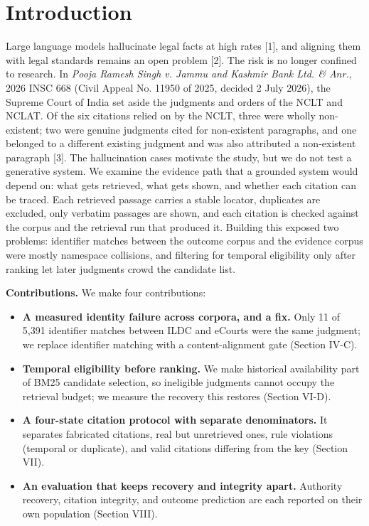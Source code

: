 \documentclass[conference]{IEEEtran}
\begin{document}
\section{Introduction}
Large language models hallucinate legal facts at high rates [1], and aligning them with legal standards remains an open problem [2]. The risk is no longer confined to research. In \textit{Pooja Ramesh Singh v. Jammu and Kashmir Bank Ltd. \& Anr.}, 2026 INSC 668 (Civil Appeal No. 11950 of 2025, decided 2 July 2026), the Supreme Court of India set aside the judgments and orders of the NCLT and NCLAT. Of the six citations relied on by the NCLT, three were wholly non-existent; two were genuine judgments cited for non-existent paragraphs, and one belonged to a different existing judgment and was also attributed a non-existent paragraph [3]. The hallucination cases motivate the study, but we do not test a generative system. We examine the evidence path that a grounded system would depend on: what gets retrieved, what gets shown, and whether each citation can be traced. Each retrieved passage carries a stable locator, duplicates are excluded, only verbatim passages are shown, and each citation is checked against the corpus and the retrieval run that produced it. Building this exposed two problems: identifier matches between the outcome corpus and the evidence corpus were mostly namespace collisions, and filtering for temporal eligibility only after ranking let later judgments crowd the candidate list.

\textbf{Contributions.} We make four contributions:
\begin{itemize}
\item \textbf{A measured identity failure across corpora, and a fix.} Only 11 of 5,391 identifier matches between ILDC and eCourts were the same judgment; we replace identifier matching with a content-alignment gate (Section IV-C).
\item \textbf{Temporal eligibility before ranking.} We make historical availability part of BM25 candidate selection, so ineligible judgments cannot occupy the retrieval budget; we measure the recovery this restores (Section VI-D).
\item \textbf{A four-state citation protocol with separate denominators.} It separates fabricated citations, real but unretrieved ones, rule violations (temporal or duplicate), and valid citations differing from the key (Section VII).
\item \textbf{An evaluation that keeps recovery and integrity apart.} Authority recovery, citation integrity, and outcome prediction are each reported on their own population (Section VIII).
\end{itemize}
\end{document}
